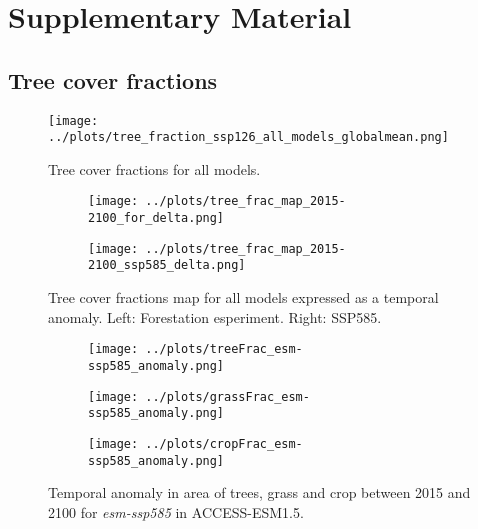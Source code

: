 \documentclass[]{article}
\begin{document}
\printbibliography

\section{Supplementary Material}
\setcounter{figure}{0}

\subsection{Tree cover fractions}

\begin{figure}[H]
    \centering
    \texttt{[image: ../plots/tree\_fraction\_ssp126\_all\_models\_globalmean.png]}
    \caption{Tree cover fractions for all models.}
    \label{fig:tree_fractions_models}
\end{figure}

\begin{figure}[H]
    \centering
    \begin{subfigure}[b]{0.4\linewidth}
        \texttt{[image: ../plots/tree\_frac\_map\_2015-2100\_for\_delta.png]}
    \end{subfigure}
    \begin{subfigure}[b]{0.4\linewidth}
        \texttt{[image: ../plots/tree\_frac\_map\_2015-2100\_ssp585\_delta.png]}
    \end{subfigure}
    \caption{Tree cover fractions map for all models expressed as a temporal anomaly. Left: Forestation esperiment. Right: SSP585.}
    \label{fig:tree_area_maps_ssp126Lu}
\end{figure}


\begin{figure}[H]
    \centering
    \begin{subfigure}[b]{0.4\linewidth}
        \texttt{[image: ../plots/treeFrac\_esm-ssp585\_anomaly.png]}
    \end{subfigure}
    \begin{subfigure}[b]{0.4\linewidth}
        \texttt{[image: ../plots/grassFrac\_esm-ssp585\_anomaly.png]}
    \end{subfigure}
    \begin{subfigure}[b]{0.4\linewidth}
        \texttt{[image: ../plots/cropFrac\_esm-ssp585\_anomaly.png]}
    \end{subfigure}
    \caption{Temporal anomaly in area of trees, grass and crop between 2015 and 2100 for \textit{esm-ssp585} in ACCESS-ESM1.5.
    }
    \label{fig:ACCESS_land_cover}
\end{figure}
\end{document}
